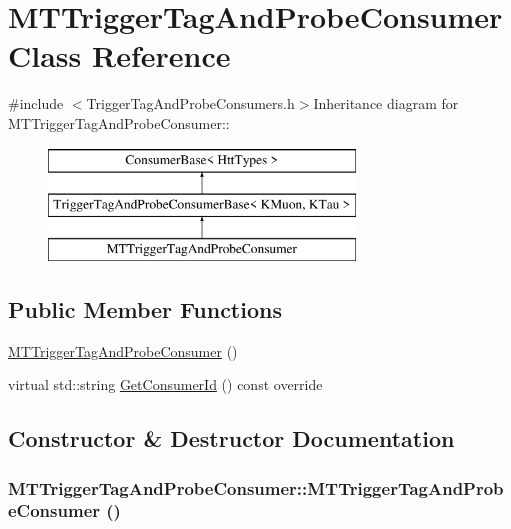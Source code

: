 \hypertarget{classMTTriggerTagAndProbeConsumer}{
\section{MTTriggerTagAndProbeConsumer Class Reference}
\label{classMTTriggerTagAndProbeConsumer}
}


{\ttfamily \#include $<$TriggerTagAndProbeConsumers.h$>$}Inheritance diagram for MTTriggerTagAndProbeConsumer::\begin{figure}[H]
\begin{center}
\leavevmode
\includegraphics[height=3cm]{classMTTriggerTagAndProbeConsumer}
\end{center}
\end{figure}
\subsection*{Public Member Functions}
\begin{DoxyCompactItemize}
\item 
\hyperlink{classMTTriggerTagAndProbeConsumer_a9f6f084a8ea44dcf092cceebee853836}{MTTriggerTagAndProbeConsumer} ()
\item 
virtual std::string \hyperlink{classMTTriggerTagAndProbeConsumer_a21da9610ba61db42e78ed35560047ed9}{GetConsumerId} () const override
\end{DoxyCompactItemize}


\subsection{Constructor \& Destructor Documentation}
\hypertarget{classMTTriggerTagAndProbeConsumer_a9f6f084a8ea44dcf092cceebee853836}{
\subsubsection[{MTTriggerTagAndProbeConsumer}]{\setlength{\rightskip}{0pt plus 5cm}MTTriggerTagAndProbeConsumer::MTTriggerTagAndProbeConsumer ()}}
\label{classMTTriggerTagAndProbeConsumer_a9f6f084a8ea44dcf092cceebee853836}


